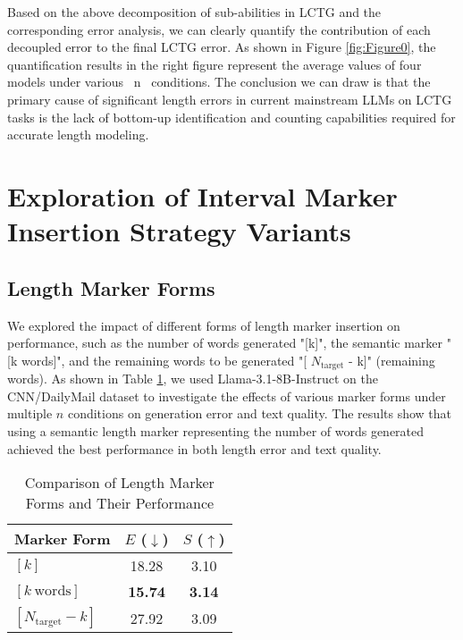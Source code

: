 Based on the above decomposition of sub-abilities in LCTG and the corresponding error analysis, we can clearly quantify the contribution of each decoupled error to the final LCTG error. As shown in Figure \ref{fig:Figure0}, the quantification results in the right figure represent the average values of four models under various \ n \
conditions. The conclusion we can draw is that the primary cause of significant length errors in current mainstream LLMs on LCTG tasks is the lack of bottom-up identification and counting capabilities required for accurate length modeling.



\section{Exploration of Interval Marker Insertion Strategy Variants}



\subsection{Length Marker Forms}
\label{sec:LM_form}


We explored the impact of different forms of length marker insertion on performance, such as the number of words generated "[k]", the semantic marker "[k words]", and the remaining words to be generated "[ $N_{\mathrm{target}}$ - k]" (remaining words). As shown in Table \ref{tab:marker_comparison}, we used Llama-3.1-8B-Instruct on the CNN/DailyMail dataset to investigate the effects of various marker forms under multiple \(n\) conditions on generation error and text quality. The results show that using a semantic length marker representing the number of words generated achieved the best performance in both length error and text quality.

\begin{table}[ht]
\centering
   \renewcommand\arraystretch{1.0}
  \setlength{\tabcolsep}{1.5em} 
\begin{tabular}{l c c}
\toprule
\textbf{Marker Form} & $E$ ($\downarrow$)  & $S$ ($\uparrow$) \\
\midrule
$[k]$ & 18.28 & 3.10 \\
$[k\ \text{words}]$ & \textbf{15.74} & \textbf{3.14} \\
$[N_{\mathrm{target}} - k]$ & 27.92 & 3.09 \\
\bottomrule
\end{tabular}
\caption{Comparison of Length Marker Forms and Their Performance}
\label{tab:marker_comparison}
\end{table}



